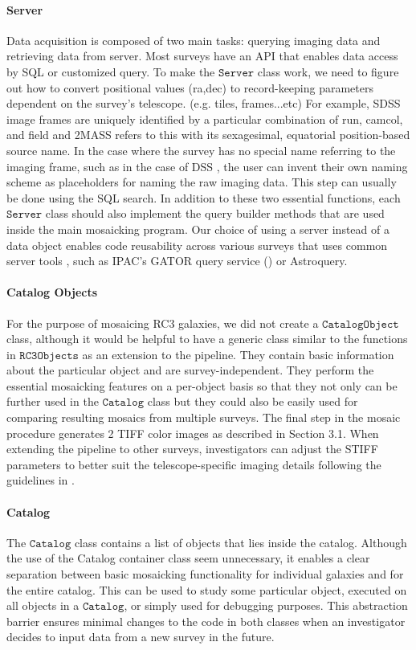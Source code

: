 \documentclass[5p]{elsarticle}
\begin{document}
 		\paragraph{Server}
		Data acquisition is composed of two main tasks: querying imaging data and retrieving data from server. Most surveys have an API that enables data access by SQL or customized query. To make the $\texttt{Server}$ class work, we need to figure out how to convert positional values (ra,dec) to record-keeping parameters dependent on the survey's telescope. (e.g. tiles, frames...etc) For example, SDSS image frames are uniquely identified by a particular combination of  run, camcol, and field and 2MASS refers to this with its sexagesimal, equatorial position-based source name. In the case where the survey has no special name referring to the imaging frame, such as in the case of DSS , the user can invent their own naming scheme as placeholders for naming the raw imaging data. This step can usually be done using the SQL search. In addition to these two essential functions, each $\texttt{Server}$ class should also implement the query builder methods that are used inside the main mosaicking program.  Our choice of using a server instead of a data object enables code reusability across various surveys that uses common server tools , such as IPAC's GATOR query service (\citet{irsa}) or  Astroquery.
	\paragraph{Catalog Objects}
	For the purpose of mosaicing RC3 galaxies, we did not create a $\texttt{CatalogObject}$ class, although it would be helpful to have a generic class similar to the functions in $\texttt{RC3Objects}$ as an extension to the pipeline. They contain basic information about the particular object and are survey-independent. They perform the essential mosaicking features on a per-object basis so that  they not only can  be further used in the $\texttt{Catalog}$ class but they could also be easily used for comparing resulting mosaics from multiple surveys. The final step in the mosaic procedure generates 2 TIFF color images as described in Section  3.1.  When extending the pipeline to other surveys, investigators can adjust the STIFF parameters to better suit the telescope-specific imaging details following the guidelines in \citet{stiff}.
	\paragraph{Catalog}
	The $\texttt{Catalog}$ class contains a list of objects that lies inside the catalog. Although the use of the Catalog container class seem unnecessary, it enables a clear separation between basic mosaicking functionality for individual galaxies and for the entire catalog. This can be used to study some particular object, executed on all objects in a $\texttt{Catalog}$, or simply used for debugging purposes. This abstraction barrier ensures minimal changes to the code in both classes when an investigator decides to input data from a new survey in the future.
\end{document}
